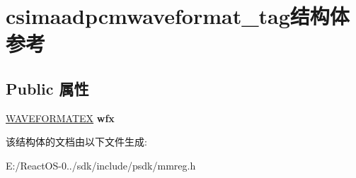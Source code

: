 \hypertarget{structcsimaadpcmwaveformat__tag}{}\section{csimaadpcmwaveformat\+\_\+tag结构体 参考}
\label{structcsimaadpcmwaveformat__tag}
\subsection*{Public 属性}
\begin{DoxyCompactItemize}
\item 
\mbox{\label{structcsimaadpcmwaveformat__tag_a301795decca7f91a6e652f82e27a4aab}} 
\hyperlink{struct_w_a_v_e_f_o_r_m_a_t_e_x}{W\+A\+V\+E\+F\+O\+R\+M\+A\+T\+EX} {\bfseries wfx}
\end{DoxyCompactItemize}


该结构体的文档由以下文件生成\+:\begin{DoxyCompactItemize}
\item 
E\+:/\+React\+O\+S-\/0../sdk/include/psdk/mmreg.\+h\end{DoxyCompactItemize}
